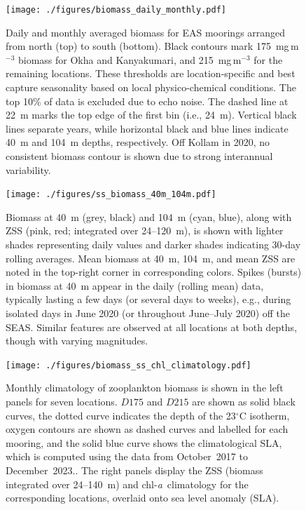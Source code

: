 \documentclass[authoryear,review,11pt]{elsarticle}
\newcommand{\chla}{chl-{\emph{a}}}
\begin{document}
\newpage

\begin{figure}[htbp]
	\centering
	\texttt{[image: ./figures/biomass\_daily\_monthly.pdf]} 
	\captionsetup{justification=justified,font=footnotesize,skip=0.05\baselineskip,width=\textwidth}
	\caption{Daily and monthly averaged biomass for EAS moorings arranged from north (top) to south (bottom). Black contours mark 175~mg\,m$^{-3}$ biomass for Okha and Kanyakumari, and 215~mg\,m$^{-3}$ for the remaining locations. These thresholds are location-specific and best capture seasonality based on local physico-chemical conditions. The top 10\% of data is excluded due to echo noise. The dashed line at 22~m marks the top edge of the first bin (i.e., 24~m). Vertical black lines separate years, while horizontal black and blue lines indicate 40~m and 104~m depths, respectively. Off Kollam in 2020, no consistent biomass contour is shown due to strong interannual variability.}
	\label{fig:biomass_daily_monthly}
\end{figure}

\begin{figure}[htbp]
	\centering
	\texttt{[image: ./figures/ss\_biomass\_40m\_104m.pdf]} 
	\captionsetup{justification=justified,font=footnotesize,skip=0.05\baselineskip,width=\textwidth}
	\caption{Biomass at 40~m (grey, black) and 104~m (cyan, blue), along with ZSS (pink, red; integrated over 24--120~m), is shown with lighter shades representing daily values and darker shades indicating 30-day rolling averages. Mean biomass at 40~m, 104~m, and mean ZSS are noted in the top-right corner in corresponding colors. Spikes (bursts) in biomass at 40~m appear in the daily (rolling mean) data, typically lasting a few days (or several days to weeks), e.g., during isolated days in June 2020 (or throughout June--July 2020) off the SEAS. Similar features are observed at all locations at both depths, though with varying magnitudes.}
	\label{fig:ss_biomass_40m_104m}
\end{figure}


\begin{figure}[htbp]
	\centering
	\texttt{[image: ./figures/biomass\_ss\_chl\_climatology.pdf]} 
	\captionsetup{justification=justified,font=footnotesize,skip=0.05\baselineskip,width=\textwidth}
	\caption{Monthly climatology of zooplankton biomass is shown in the left panels for seven locations. $D175$ and $D215$ are shown as solid black curves, the dotted curve indicates the depth of the 23$^{\circ}$C isotherm, oxygen contours are shown as dashed curves and labelled for each mooring, and the solid blue curve shows the climatological SLA, which is computed using the data from October~2017 to December~2023.. The right panels display the ZSS (biomass integrated over 24--140~m) and \chla\ climatology for the corresponding locations, overlaid onto sea level anomaly (SLA).}
	\label{fig:biomass_ss_chl_climatology}
\end{figure}
\end{document}
